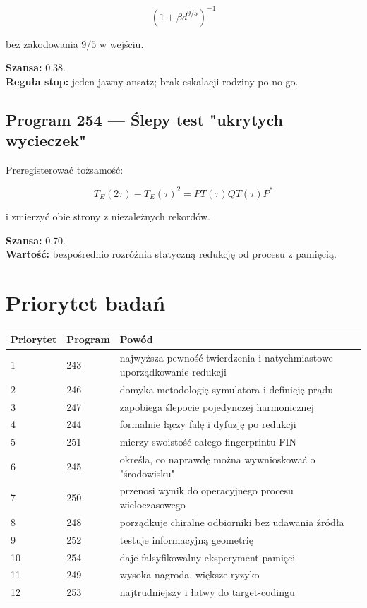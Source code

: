 \documentclass[11pt,a4paper,openany]{report}
\begin{document}
\[
(1+\beta d^{9/5})^{-1}
\]

bez zakodowania \(9/5\) w wejściu.

\textbf{Szansa:} 0.38.\\
\textbf{Reguła stop:} jeden jawny ansatz; brak eskalacji rodziny po no-go.

\section{Program 254 --- Ślepy test "ukrytych wycieczek"}

Preregisterować to\.zsamość:

\[
T_E(2\tau)-T_E(\tau)^2
=PT(\tau)QT(\tau)P^\ast
\]

i zmierzyć obie strony z niezale\.znych rekordów.

\textbf{Szansa:} 0.70.\\
\textbf{Wartość:} bezpośrednio rozró\.znia statyczną redukcję od procesu z pamięcią.

\chapter{Priorytet badań}

\begin{center}
\begingroup\small
\setlength{\tabcolsep}{3.5pt}
\renewcommand{\arraystretch}{1.16}
\begin{longtable}{@{}p{}p{}p{}@{}}
\toprule
\textbf{Priorytet} & \textbf{Program} & \textbf{Powód} \\
\midrule
\endhead
1 & 243 & najwy\.zsza pewność twierdzenia i natychmiastowe uporządkowanie redukcji \\
2 & 246 & domyka metodologię symulatora i definicję prądu \\
3 & 247 & zapobiega ślepocie pojedynczej harmonicznej \\
4 & 244 & formalnie łączy falę i dyfuzję po redukcji \\
5 & 251 & mierzy swoistość całego fingerprintu FIN \\
6 & 245 & określa, co naprawdę mo\.zna wywnioskować o "środowisku" \\
7 & 250 & przenosi wynik do operacyjnego procesu wieloczasowego \\
8 & 248 & porządkuje chiralne odbiorniki bez udawania źródła \\
9 & 252 & testuje informacyjną geometrię \\
10 & 254 & daje falsyfikowalny eksperyment pamięci \\
11 & 249 & wysoka nagroda, większe ryzyko \\
12 & 253 & najtrudniejszy i łatwy do target-codingu \\
\bottomrule
\end{longtable}
\endgroup
\end{center}
\end{document}
